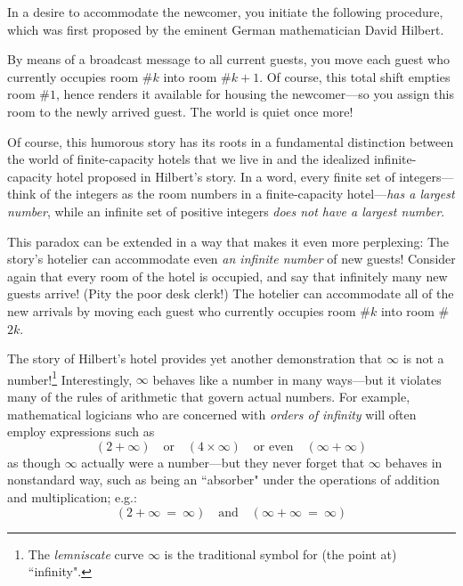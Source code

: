 In a desire to accommodate the newcomer, you initiate the following procedure, which was first proposed by the eminent German mathematician David Hilbert. 

\smallskip

By means of a broadcast message to all current guests, you move each guest who currently occupies room \#$k$ into room \#$k+1$.  Of course, this total shift empties room \#$1$, hence renders it available for housing the newcomer---so you assign this room to the newly arrived guest.  The world is quiet once more!

\smallskip

Of course, this humorous story has its roots in a fundamental distinction between the world of finite-capacity hotels that we live in and the idealized infinite-capacity hotel proposed in Hilbert's story.  In a word, every finite set of integers---think of the integers as the room numbers in a finite-capacity hotel---{\em has a largest number}, while an infinite set of positive integers {\em does not have a largest number}.

\medskip
  
This paradox can be extended in a way that makes it even more  perplexing:  The story's hotelier can accommodate even {\em an infinite number} of new guests!  Consider again that every room 
of the hotel is occupied, and say that infinitely many new guests arrive!  (Pity the poor desk clerk!)  The hotelier can accommodate all of the new arrivals by moving each guest who currently occupies room \#$k$ into room \#$2k$.

\medskip

The story of Hilbert's hotel provides yet another demonstration that $\infty$ is not a number!\footnote{The \textit{lemniscate} curve $\infty$ is the traditional symbol for (the point at) ``infinity".} Interestingly, $\infty$ behaves like a number in many ways---but it violates many of the rules of arithmetic that govern actual numbers.  For example, mathematical logicians who are concerned with {\em orders of infinity} will often employ expressions such as
\[ (2 + \infty)  \ \ \  \mbox{ or } \ \ \ (4 \times \infty) \ \ \
\mbox{ or even } \ \ \ (\infty + \infty) \]
as though $\infty$ actually were a number---but they never forget that $\infty$ behaves in nonstandard way, such as being an ``absorber" under the operations of addition and multiplication; e.g.:
\[ (2 + \infty \ = \ \infty)  \ \ \  \mbox{ and } \ \ \  (\infty + \infty \ = \ \infty) \]

